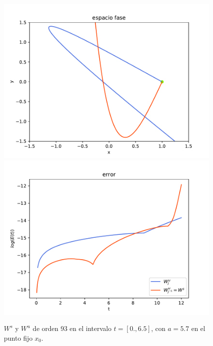 \documentclass[11pt]{beamer}
\theoremstyle{definition}
\begin{document}
\begin{frame}
\begin{figure}[H]
\centering
\includegraphics[scale=0.35]{jung57}
\includegraphics[scale=0.35]{error_jung57}
\caption{$W^{s}$ y $W^{u}$ de orden 93 en el intervalo $t=[0.,6.5]$, con $a=5.7$ en el punto fijo $x_{0}$.}
\label{jung2}
\end{figure}

\end{frame}
\end{document}
